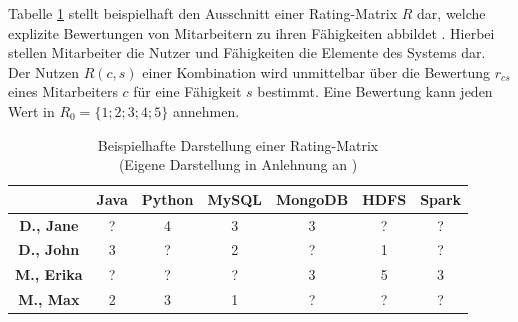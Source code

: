 Tabelle \ref{tab1} stellt beispielhaft den Ausschnitt einer Rating-Matrix $R$ dar, welche explizite Bewertungen von Mitarbeitern zu ihren Fähigkeiten abbildet \cite[S. 735]{adomavicius:inproceedings}\cite[S. 16]{link:booklet}.
Hierbei stellen Mitarbeiter die Nutzer und Fähigkeiten die Elemente des Systems dar.
Der Nutzen $R(c,s)$ einer Kombination wird unmittelbar über die Bewertung $r_{cs}$ eines Mitarbeiters $c$ für eine Fähigkeit $s$ bestimmt.
Eine Bewertung kann jeden Wert in $R_{0}=\{1;2;3;4;5\}$ annehmen.

\begin{table}[htbp]
    \begin{center}
    \begin{tabular}{c|c|c|c|c|c|c}
    {} & {\textbf{Java}} & {\textbf{Python}} & {\textbf{MySQL}} & {\textbf{MongoDB}} & {\textbf{HDFS}} & {\textbf{Spark}}\\
    \hline
    \textbf{D., Jane} & ? & 4 & 3 & 3 & ? & ?\\
    \hline
    \textbf{D., John} & 3 & ? & 2 & ? & 1 & ?\\
    \hline
    \textbf{M., Erika} & ? & ? & ? & 3 & 5 & 3\\
    \hline
    \textbf{M., Max} & 2 & 3 & 1 & ? & ? & ?\\
    \end{tabular}
    \end{center}
    \caption[Beispielhafte Darstellung einer Rating-Matrix ]{Beispielhafte Darstellung einer Rating-Matrix \\
	(Eigene Darstellung in Anlehnung an \cite[S. 16]{link:booklet})}
	\label{tab1}
\end{table}

